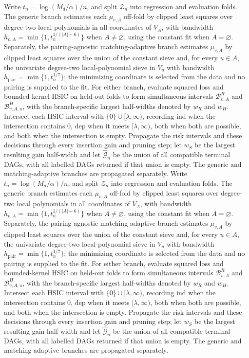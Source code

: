 Write \(t_n=\log(M_d/\alpha)/n\), and split \(\mathcal Z_n\) into regression and evaluation folds. The generic branch estimates each \(\mu_{v,A}\) off-fold by clipped least squares over degree-two local polynomials in all coordinates of \(V_A\), with bandwidth \(h_{v,A}=\min\{1,t_n^{1/(|A|+6)}\}\) when \(A\ne\varnothing\), using the constant fit when \(A=\varnothing\). Separately, the pairing-agnostic matching-adaptive branch estimates \(\mu_{v,A}\) by clipped least squares over the union of the constant sieve and, for every \(u\in A\), the univariate degree-two local-polynomial sieve in \(V_u\) with bandwidth \(h_{\mathrm{pair}}=\min\{1,t_n^{1/7}\}\); the minimizing coordinate is selected from the data and no pairing is supplied to the fit. For either branch, evaluate squared loss and bounded-kernel HSIC on held-out folds to form simultaneous intervals \(\mathcal B^R_{v,A}\) and \(\mathcal B^H_{v,A,u}\), with the branch-specific largest half-widths denoted by \(w_R\) and \(w_H\). Intersect each HSIC interval with \(\{0\}\cup[\lambda,\infty)\), recording \(\mathrm{ind}\) when the intersection contains \(0\), \(\mathrm{dep}\) when it meets \([\lambda,\infty)\), both when both are possible, and both when the intersection is empty. Propagate the risk intervals and these decisions through every insertion gain and pruning step; let \(w_S\) be the largest resulting gain half-width and let \(\widehat{\mathcal G}_n\) be the union of all compatible terminal DAGs, with all labelled DAGs returned if that union is empty. The generic and matching-adaptive branches are propagated separately.
Write \(t_n=\log(M_d/\alpha)/n\), and split \(\mathcal Z_n\) into regression and evaluation folds. The generic branch estimates each \(\mu_{v,A}\) off-fold by clipped least squares over degree-two local polynomials in all coordinates of \(V_A\), with bandwidth \(h_{v,A}=\min\{1,t_n^{1/(|A|+6)}\}\) when \(A\ne\varnothing\), using the constant fit when \(A=\varnothing\). Separately, the pairing-agnostic matching-adaptive branch estimates \(\mu_{v,A}\) by clipped least squares over the union of the constant sieve and, for every \(u\in A\), the univariate degree-two local-polynomial sieve in \(V_u\) with bandwidth \(h_{\mathrm{pair}}=\min\{1,t_n^{1/7}\}\); the minimizing coordinate is selected from the data and no pairing is supplied to the fit. For either branch, evaluate squared loss and bounded-kernel HSIC on held-out folds to form simultaneous intervals \(\mathcal B^R_{v,A}\) and \(\mathcal B^H_{v,A,u}\), with the branch-specific largest half-widths denoted by \(w_R\) and \(w_H\). Intersect each HSIC interval with \(\{0\}\cup[\lambda,\infty)\), recording \(\mathrm{ind}\) when the intersection contains \(0\), \(\mathrm{dep}\) when it meets \([\lambda,\infty)\), both when both are possible, and both when the intersection is empty. Propagate the risk intervals and these decisions through every insertion gain and pruning step; let \(w_S\) be the largest resulting gain half-width and let \(\widehat{\mathcal G}_n\) be the union of all compatible terminal DAGs, with all labelled DAGs returned if that union is empty. The generic and matching-adaptive branches are propagated separately.
